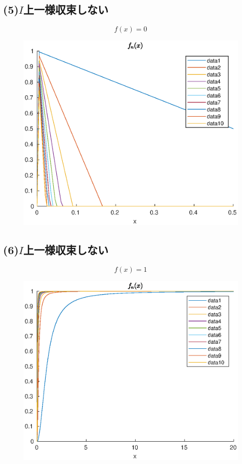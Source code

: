 \documentclass{jreport}
\begin{document}
\subsection{(5)$I$上一様収束しない}
$$
f(x)=0
$$
\begin{figure}[H]
	\centering
	\includegraphics[scale=0.3]{5.eps}
\end{figure}
\subsection{(6)$I$上一様収束しない}
$$
f(x) =1
$$
\begin{figure}[H]
	\centering
	\includegraphics[scale=0.3]{6.eps}
\end{figure}
\newpage
\end{document}
